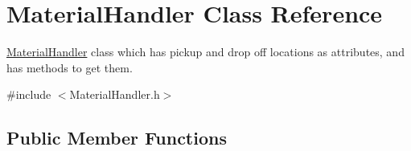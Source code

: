 \hypertarget{classMaterialHandler}{}\section{Material\+Handler Class Reference}
\label{classMaterialHandler}


\hyperlink{classMaterialHandler}{Material\+Handler} class which has pickup and drop off locations as attributes, and has methods to get them.  




{\ttfamily \#include $<$Material\+Handler.\+h$>$}

\subsection*{Public Member Functions}
